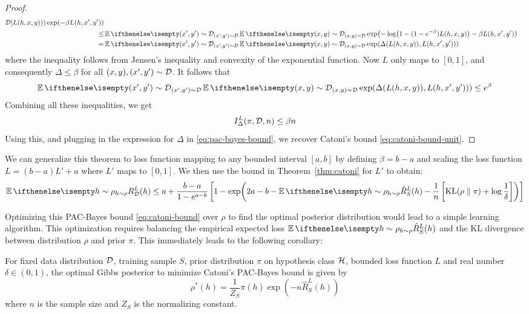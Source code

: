 \begin{proof}
\begin{equation}
\begin{split}
{      \CD]{L(h, x, y)})) \exp(-\beta L(h, x', y'))} \\
      \leq& \Ev[(x', y') \sim \CD]{\Ev[(x, y) \sim \CD]{\exp(- \log(1 - (1 -
      e^{-\beta}) L(h, x, y)) - \beta L(h, x', y'))}} \\
      =& \Ev[(x', y') \sim \CD]{\Ev[(x, y) \sim \CD]{\exp(\Delta(L(h, x, y)),
      L(h, x', y')))}}
    \end{split}
  \end{equation}
  where the inequality follows from Jensen's inequality and convexity of the
  exponential function. Now $L$ only maps to $[0, 1]$, and consequently $\Delta
  \leq \beta$ for all $(x, y), (x', y') \sim \mathcal{D}$. It follows that
  \begin{equation}
    \Ev[(x', y') \sim \CD]{\Ev[(x, y) \sim \CD]{\exp(\Delta(L(h, x, y)), L(h,
    x', y')))}} \leq e^\beta
  \end{equation}
  Combining all these inequalities, we get
  \begin{equation}
    I_\Delta^L(\pi, \mathcal{D}, n) \leq \beta n
  \end{equation}
  Using this, and plugging in the expression for $\Delta$ in
  \eqref{eq:pac-bayes-bound}, we recover Catoni's bound
  \eqref{eq:catoni-bound-unit}.
\end{proof}

We can generalize this theorem to loss function mapping to any bounded interval
$[a, b]$ by defining $\beta = b - a$ and scaling the loss function $L = (b - a)
L' + a$ where $L'$ maps to $[0, 1]$. We then use the bound in
Theorem~\ref{thm:catoni} for $L'$ to obtain:
\begin{equation}
  \label{eq:catoni-bound}
  \Ev[h \sim \rho]{R_\CD^L(h)} \leq a + \frac{b - a}{1 - e^{a - b}} \left[1 -
  \exp(2 a - b - \Ev[h \sim \rho]{\hat{R}_S^L(h)} - \frac{1}{n}
  \left[\KL{\rho}{\pi} + \log \frac{1}{\delta}\right])\right]
\end{equation}

Optimizing this PAC-Bayes bound \eqref{eq:catoni-bound} over $\rho$ to find the
optimal posterior distribution would lead to a simple learning algorithm.  This
optimization requires balancing the empirical expected loss $\Ev[h \sim
\rho]{\hat{R}_S^L(h)}$ and the KL divergence between distribution $\rho$ and
prior $\pi$. This immediately leads to the following corollary:

\begin{corollary}
  \label{cor:gibbs}
  For fixed data distribution $\mathcal{D}$, training sample $S$, prior distribution
  $\pi$ on hypothesis class $\mathcal{H}$, bounded loss function $L$ and real number
  $\delta \in (0, 1)$, the optimal Gibbs posterior to minimize Catoni's
  PAC-Bayes bound is given by
  \begin{equation}
    \rho^*(h) = \frac{1}{Z_S} \pi(h) \exp(-n \hat{R}_S^L(h))
  \end{equation}
  where $n$ is the sample size and $Z_S$ is the normalizing constant.
\end{corollary}

